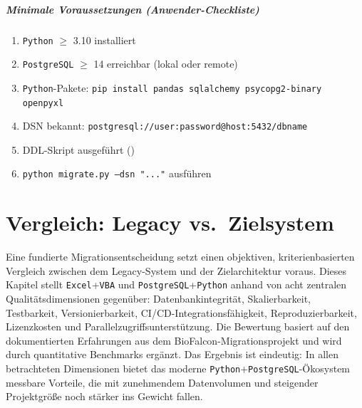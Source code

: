 ﻿\documentclass[12pt,a4paper]{report}
\theoremstyle{definition}
\theoremstyle{remark}
\newcommand{\excel}{\texttt{Excel}}
\newcommand{\vba}{\texttt{VBA}}
\newcommand{\pg}{\texttt{PostgreSQL}}
\newcommand{\py}{\texttt{Python}}
\newcommand{\code}[1]{\texttt{#1}}
\begin{document}
\paragraph{Minimale Voraussetzungen (Anwender-Checkliste)}
\begin{enumerate}[leftmargin=1.5em, topsep=2pt, itemsep=2pt]
  \item \py{} $\geq$ 3.10 installiert
  \item \pg{} $\geq$ 14 erreichbar (lokal oder remote)
  \item \py-Pakete: \code{pip install pandas sqlalchemy psycopg2-binary openpyxl}
  \item DSN bekannt: \code{postgresql://user:password@host:5432/dbname}
  \item DDL-Skript ausgeführt ()
  \item \code{python migrate.py --dsn "..."} ausführen
\end{enumerate}

\chapter{Vergleich: Legacy vs.\ Zielsystem}

Eine fundierte Migrationsentscheidung setzt einen objektiven, kriterienbasierten Vergleich zwischen dem Legacy-System und der Zielarchitektur voraus. Dieses Kapitel stellt \excel{}+\vba{} und \pg{}+\py{} anhand von acht zentralen Qualitätsdimensionen gegenüber: Datenbankintegrität, Skalierbarkeit, Testbarkeit, Versionierbarkeit, CI/CD-Integrationsfähigkeit, Reproduzierbarkeit, Lizenzkosten und Parallelzugriffsunterstützung. Die Bewertung basiert auf den dokumentierten Erfahrungen aus dem BioFalcon-Migrations\-projekt und wird durch quantitative Benchmarks ergänzt. Das Ergebnis ist eindeutig: In allen betrachteten Dimensionen bietet das moderne \py{}+\pg{}-Ökosystem messbare Vorteile, die mit zunehmendem Datenvolumen und steigender Projektgröße noch stärker ins Gewicht fallen.
\end{document}
